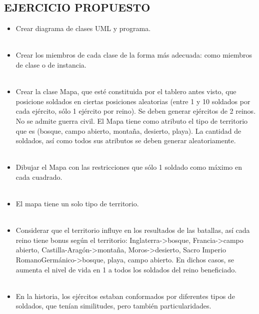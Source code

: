 \documentclass{article}
\begin{document}
\begin{itemize}
    \section{EJERCICIO PROPUESTO}
	\begin{itemize}
        \textcolor{red}{PROBLEMA 01}
        \\
        \\
        \item Crear diagrama de clases UML y programa.
        \\
        \\
        \item Crear los miembros de cada clase de la forma más adecuada: como miembros de clase o de instancia.
        \\
        \\
        \item Crear la clase Mapa, que esté constituida por el tablero antes visto, que posicione soldados en ciertas posiciones aleatorias (entre 1 y 10 soldados por cada ejército, sólo 1 ejército por reino). Se deben generar ejércitos de 2 reinos. No se admite guerra civil. El Mapa tiene como atributo el tipo de territorio que es (bosque, campo abierto, montaña, desierto, playa). La cantidad de soldados, así como todos sus atributos se deben generar aleatoriamente.
        \\
        \\
        \item Dibujar el Mapa con las restricciones que sólo 1 soldado como máximo en cada cuadrado.
        \\
        \\
        \item El mapa tiene un solo tipo de territorio.
        \\
        \\
        \item Considerar que el territorio influye en los resultados de las batallas, así cada reino tiene bonus según el territorio: Inglaterra->bosque, Francia->campo abierto, Castilla-Aragón->montaña, Moros->desierto, Sacro Imperio RomanoGermánico->bosque, playa, campo abierto. En dichos casos, se aumenta el nivel de vida en 1 a todos los soldados del reino beneficiado.
        \\
        \\
        \item En la historia, los ejércitos estaban conformados por diferentes tipos de soldados, que tenían similitudes, pero también particularidades.

\end{itemize}
\end{itemize}
\end{document}
